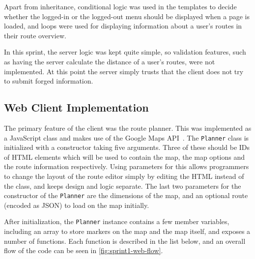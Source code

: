 Apart from inheritance, conditional logic was used in the templates to decide whether the logged-in or the logged-out menu should be displayed when a page is loaded, and loops were used for displaying information about a user's routes in their route overview.

In this sprint, the server logic was kept quite simple, so validation features, such as having the server calculate the distance of a user's routes, were not implemented. At this point the server simply trusts that the client does not try to submit forged information.

\subsection{Web Client Implementation}

The primary feature of the client was the route planner. This was implemented as a JavaScript class and makes use of the Google Maps \ac{API}~\citep{gmapsapi}. The \texttt{Planner} class is initialized with a constructor taking five arguments. Three of these should be IDs of \ac{HTML} elements which will be used to contain the map, the map options and the route information respectively. Using parameters for this allows programmers to change the layout of the route editor simply by editing the \ac{HTML} instead of the class, and keeps design and logic separate. The last two parameters for the constructor of the \texttt{Planner} are the dimensions of the map, and an optional route (encoded as \ac{JSON}) to load on the map initially.

After initialization, the \texttt{Planner} instance contains a few member variables, including an array to store markers on the map and the map itself, and exposes a number of functions. Each function is described in the list below, and an overall flow of the code can be seen in \autoref{fig:sprint1-web-flow}.


